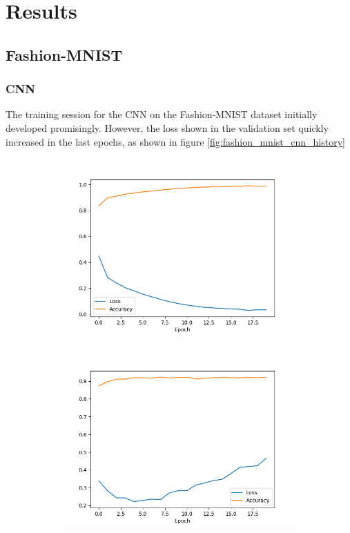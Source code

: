\documentclass[../main.tex]{subfiles}
\begin{document}
\section{Results}

\subsection{Fashion-MNIST}
\subsubsection{CNN}
The training session for the CNN on the Fashion-MNIST dataset initially developed promisingly. However, the loss shown in the validation set quickly increased in the last epochs, as shown in figure \ref{fig:fashion_mnist_cnn_history}

\begin{figure}[H]
    \begin{subfigure}{.5\textwidth}
        \centering
        \includegraphics[width=1.1\linewidth]{doc/assets/fashion_mnist_train_history.png}
    \end{subfigure}
    \begin{subfigure}{.5\textwidth}
        \centering
        \includegraphics[width=1.1\linewidth]{doc/assets/fashion_mnist_val_history.png}

\end{subfigure}
\end{figure}
\end{document}
